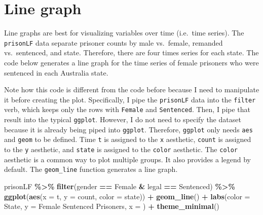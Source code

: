 \documentclass[
]{book}
\makeatletter
\newenvironment{Shaded}{\begin{snugshade}}{\end{snugshade}}
\newcommand{\AttributeTok}[1]{\textcolor[rgb]{0.27,0.27,0.27}{#1}}
\newcommand{\FunctionTok}[1]{\textcolor[rgb]{0.27,0.27,0.27}{\textbf{#1}}}
\newcommand{\NormalTok}[1]{#1}
\newcommand{\SpecialCharTok}[1]{\textcolor[rgb]{0.43,0.43,0.43}{\textbf{#1}}}
\newcommand{\StringTok}[1]{\textcolor[rgb]{0.5,0.5,0.5}{#1}}
\newenvironment{kframe}{%
\medskip{}
\setlength{\fboxsep}{.8em}
 \def\at@end@of@kframe{}%
 \ifinner\ifhmode%
  \def\at@end@of@kframe{\end{minipage}}%
  \begin{minipage}{\columnwidth}%
 \fi\fi%
 \def\FrameCommand##1{\hskip\@totalleftmargin \hskip-\fboxsep
 \colorbox{shadecolor}{##1}\hskip-\fboxsep
     \hskip-\linewidth \hskip-\@totalleftmargin \hskip\columnwidth}%
 \MakeFramed {\advance\hsize-\width
   \@totalleftmargin\z@ \linewidth\hsize
   \@setminipage}}%
 {\par\unskip\endMakeFramed%
 \at@end@of@kframe}
\renewenvironment{Shaded}{\begin{kframe}}{\end{kframe}}
\makeatother
\begin{document}
\hypertarget{line-graph-1}{%
\section{Line graph}\label{line-graph-1}}

Line graphs are best for visualizing variables over time (i.e.~time series). The \texttt{prisonLF} data separate prisoner counts by male vs.~female, remanded vs.~sentenced, and state. Therefore, there are four times series for each state. The code below generates a line graph for the time series of female prisoners who were sentenced in each Australia state.

Note how this code is different from the code before because I need to manipulate it before creating the plot. Specifically, I pipe the \texttt{prisonLF} data into the \texttt{filter} verb, which keeps only the rows with \texttt{Female} and \texttt{Sentenced}. Then, I pipe that result into the typical \texttt{ggplot}. However, I do not need to specify the dataset because it is already being piped into \texttt{ggplot}. Therefore, \texttt{ggplot} only needs \texttt{aes} and \texttt{geom} to be defined. Time \texttt{t} is assigned to the \texttt{x} aesthetic, \texttt{count} is assigned to the \texttt{y} aesthetic, and \texttt{state} is assigned to the \texttt{color} aesthetic. The \texttt{color} aesthetic is a common way to plot multiple groups. It also provides a legend by default. The \texttt{geom\_line} function generates a line graph.

\begin{Shaded}
\begin{Highlighting}[]
\NormalTok{prisonLF }\SpecialCharTok{\%\textgreater{}\%} 
  \FunctionTok{filter}\NormalTok{(gender }\SpecialCharTok{==} \StringTok{\textquotesingle{}Female\textquotesingle{}} \SpecialCharTok{\&}\NormalTok{ legal }\SpecialCharTok{==} \StringTok{\textquotesingle{}Sentenced\textquotesingle{}}\NormalTok{) }\SpecialCharTok{\%\textgreater{}\%} 
  \FunctionTok{ggplot}\NormalTok{(}\FunctionTok{aes}\NormalTok{(}\AttributeTok{x =}\NormalTok{ t, }\AttributeTok{y =}\NormalTok{ count, }\AttributeTok{color =}\NormalTok{ state)) }\SpecialCharTok{+}
  \FunctionTok{geom\_line}\NormalTok{() }\SpecialCharTok{+}
  \FunctionTok{labs}\NormalTok{(}\AttributeTok{color =} \StringTok{\textquotesingle{}State\textquotesingle{}}\NormalTok{, }\AttributeTok{y =} \StringTok{\textquotesingle{}Female Sentenced Prisoners\textquotesingle{}}\NormalTok{, }\AttributeTok{x =} \StringTok{\textquotesingle{}\textquotesingle{}}\NormalTok{) }\SpecialCharTok{+}
  \FunctionTok{theme\_minimal}\NormalTok{()}
\end{Highlighting}
\end{Shaded}
\end{document}
